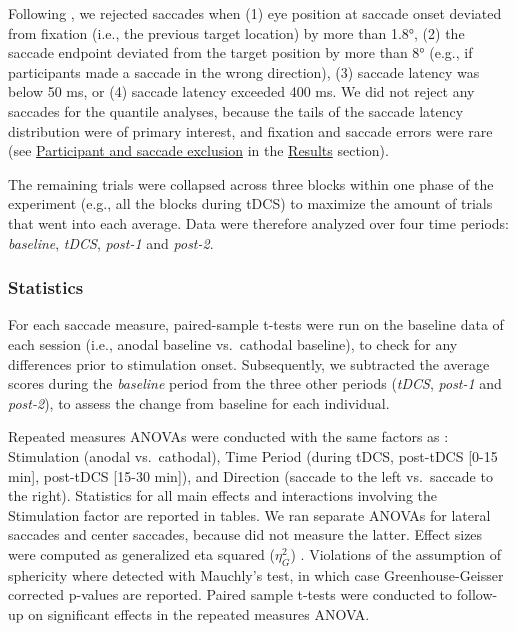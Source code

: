 \documentclass[11pt,]{memoir}
\begin{document}
Following \textcite{Kanai2012}, we rejected saccades when (1) eye position at saccade onset deviated from fixation (i.e., the previous target location) by more than 1.8°, (2) the saccade endpoint deviated from the target position by more than 8° (e.g., if participants made a saccade in the wrong direction), (3) saccade latency was below 50 ms, or (4) saccade latency exceeded 400 ms. We did not reject any saccades for the quantile analyses, because the tails of the saccade latency distribution were of primary interest, and fixation and saccade errors were rare (see \protect\hyperlink{participant-and-saccade-exclusion}{Participant and saccade exclusion} in the \protect\hyperlink{sacc_tDCS-results}{Results} section).

The remaining trials were collapsed across three blocks within one phase of the experiment (e.g., all the blocks during tDCS) to maximize the amount of trials that went into each average. Data were therefore analyzed over four time periods: \emph{baseline}, \emph{tDCS}, \emph{post-1} and \emph{post-2}.

\hypertarget{statistics}{%
\subsubsection{Statistics}\label{statistics}}

For each saccade measure, paired-sample t-tests were run on the baseline data of each session (i.e., anodal baseline vs.~cathodal baseline), to check for any differences prior to stimulation onset. Subsequently, we subtracted the average scores during the \emph{baseline} period from the three other periods (\emph{tDCS}, \emph{post-1} and \emph{post-2}), to assess the change from baseline for each individual.

Repeated measures ANOVAs were conducted \autocite{R-ez} with the same factors as \textcite{Kanai2012}: Stimulation (anodal vs.~cathodal), Time Period (during tDCS, post-tDCS {[}0-15 min{]}, post-tDCS {[}15-30 min{]}), and Direction (saccade to the left vs.~saccade to the right). Statistics for all main effects and interactions involving the Stimulation factor are reported in tables. We ran separate ANOVAs for lateral saccades and center saccades, because \textcite{Kanai2012} did not measure the latter. Effect sizes were computed as generalized eta squared (\(\eta_{G}^{2}\)) \autocite{Bakeman2005}. Violations of the assumption of sphericity where detected with Mauchly's test, in which case Greenhouse-Geisser corrected p-values are reported. Paired sample t-tests were conducted to follow-up on significant effects in the repeated measures ANOVA.
\end{document}
